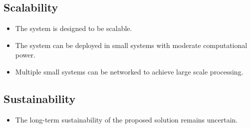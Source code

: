 \subsection{Scalability}
\begin{itemize}
    \item The system is designed to be scalable.
    \item The system can be deployed in small systems with moderate computational power.
    \item Multiple small systems can be networked to achieve large scale processing.
\end{itemize}


\subsection{Sustainability}
\begin{itemize}
    \item The long-term sustainability of the proposed solution remains uncertain.
\end{itemize}
